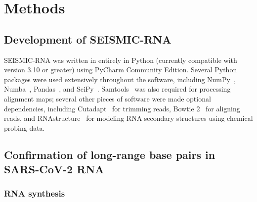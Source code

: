 \documentclass[main.tex]{subfiles}
\begin{document}
\section{Methods}
\label{methods}


\subsection{Development of SEISMIC-RNA}

SEISMIC-RNA was written in entirely in Python (currently compatible with version 3.10 or greater) using PyCharm Community Edition.
Several Python packages were used extensively throughout the software, including NumPy~\cite{Harris2020}, Numba~\cite{Lam2015}, Pandas~\cite{McKinney2010,Reback2020}, and SciPy~\cite{Virtanen2020}.
Samtools~\cite{Li2009} was also required for processing alignment maps; several other pieces of software were made optional dependencies, including Cutadapt~\cite{Martin2011} for trimming reads, Bowtie 2~\cite{Langmead2012} for aligning reads, and RNAstructure~\cite{Reuter2010} for modeling RNA secondary structures using chemical probing data.


\subsection{Confirmation of long-range base pairs in SARS-CoV-2 RNA}

\subsubsection{RNA synthesis}
\end{document}
